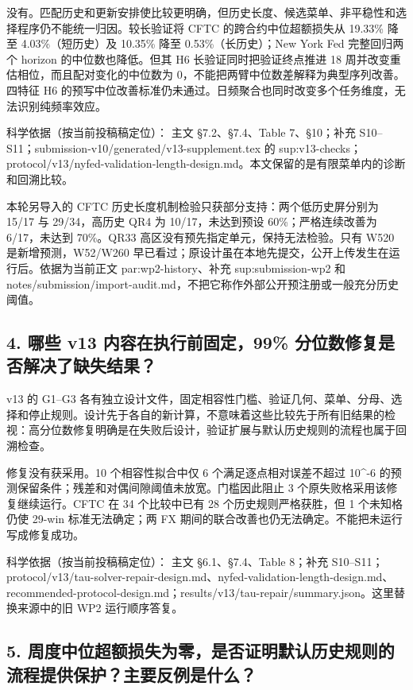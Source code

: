 \documentclass[11pt,a4paper]{article}
\begin{document}
没有。匹配历史和更新安排使比较更明确，但历史长度、候选菜单、非平稳性和选择程序仍不能统一归因。较长验证将 CFTC 的跨合约中位超额损失从 19.33\% 降至 4.03\%（短历史）及 10.35\% 降至 0.53\%（长历史）；New York Fed 完整回归两个 horizon 的中位数也降低。但其 H6 长验证同时把验证终点推进 18 周并改变重估相位，而且配对变化的中位数为 0，不能把两臂中位数差解释为典型序列改善。四特征 H6 的预写中位改善标准仍未通过。日频聚合也同时改变多个任务维度，无法识别纯频率效应。

科学依据（按当前投稿稿定位）： 主文 §7.2、§7.4、Table 7、§10；补充 S10--S11；submission-v10/generated/v13-supplement.tex 的 sup:v13-checks；protocol/v13/nyfed-validation-length-design.md。本文保留的是有限菜单内的诊断和回溯比较。

本轮另导入的 CFTC 历史长度机制检验只获部分支持：两个低历史屏分别为 15/17 与 29/34，高历史 QR4 为 10/17，未达到预设 60\%；严格连续改善为 6/17，未达到 70\%。QR33 高区没有预先指定单元，保持无法检验。只有 W520 是新增预测，W52/W260 早已看过；原设计虽在本地先提交，公开上传发生在运行后。依据为当前正文 par:wp2-history、补充 sup:submission-wp2 和 notes/submission/import-audit.md，不把它称作外部公开预注册或一般充分历史阈值。

\subsection*{4. 哪些 v13 内容在执行前固定，99\% 分位数修复是否解决了缺失结果？}

v13 的 G1--G3 各有独立设计文件，固定相容性门槛、验证几何、菜单、分母、选择和停止规则。设计先于各自的新计算，不意味着这些比较先于所有旧结果的检视：高分位数修复明确是在失败后设计，验证扩展与默认历史规则的流程也属于回溯检查。

修复没有获采用。10 个相容性拟合中仅 6 个满足逐点相对误差不超过 10\textasciicircum{}-6 的预测保留条件；残差和对偶间隙阈值未放宽。门槛因此阻止 3 个原失败格采用该修复继续运行。CFTC 在 34 个比较中已有 28 个历史规则严格获胜，但 1 个未知格仍使 29-win 标准无法确定；两 FX 期间的联合改善也仍无法确定。不能把未运行写成修复成功。

科学依据（按当前投稿稿定位）： 主文 §6.1、§7.4、Table 8；补充 S10--S11；protocol/v13/tau-solver-repair-design.md、nyfed-validation-length-design.md、recommended-protocol-design.md；results/v13/tau-repair/summary.json。这里替换来源中的旧 WP2 运行顺序答复。

\subsection*{5. 周度中位超额损失为零，是否证明默认历史规则的流程提供保护？主要反例是什么？}
\end{document}
